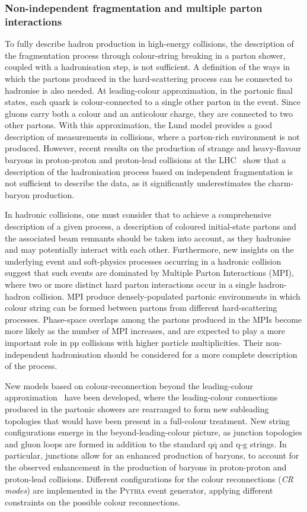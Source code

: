\subsubsection{Non-independent fragmentation and multiple parton interactions}
To fully describe hadron production in high-energy collisions, the description of the fragmentation process through colour-string breaking in a parton shower, coupled with a hadronisation step, is not sufficient. A definition of the ways in which the partons produced in the hard-scattering process can be connected to hadronise is also needed. At leading-colour approximation, in the partonic final states, each quark is colour-connected to a single other parton in the event. Since gluons carry both a colour and an anticolour charge, they are connected to two other partons. With this approximation, the Lund model provides a good description of measurements in \ee collisions, where a parton-rich environment is not produced. However, recent results on the production of strange and heavy-flavour baryons in proton-proton and proton-lead collisions at the LHC~\cite{ALICE:2022exq,ALICE:2024ozd} show that a description of the hadronisation process based on independent fragmentation is not sufficient to describe the data, as it significantly underestimates the charm-baryon production.

In hadronic collisions, one must consider that to achieve a comprehensive description of a given process, a description of coloured initial-state partons and the associated beam remnants should be taken into account, as they hadronise and may potentially interact with each other. Furthermore, new insights on the underlying event and soft-physics processes occurring in a hadronic collision suggest that such events are dominated by Multiple Parton Interactions (MPI), where two or more distinct hard parton interactions occur in a single hadron-hadron collision. MPI produce densely-populated partonic environments in which colour string can be formed between partons from different hard-scattering processes. Phase-space overlaps among the partons produced in the MPIs become more likely as the number of MPI increases, and are expected to play a more important role in pp collisions with higher particle multiplicities. Their non-independent hadronisation should be considered for a more complete description of the process. 

New models based on colour-reconnection beyond the leading-colour approximation~\cite{Christiansen:2015yqa} have been developed, where the leading-colour connections produced in the partonic showers are rearranged to form new subleading topologies that would have been present in a full-colour treatment. New string configurations emerge in the beyond-leading-colour picture, as junction topologies and gluon loops are formed in addition to the standard $\mathrm{q\overline{q}}$ and q-g strings. In particular, junctions allow for an enhanced production of baryons, to account for the observed enhancement in the production of baryons in proton-proton and proton-lead collisions. Different configurations for the colour reconnections (\emph{CR modes}) are implemented in the \textsc{Pythia} event generator, applying different constraints on the possible colour reconnections.

